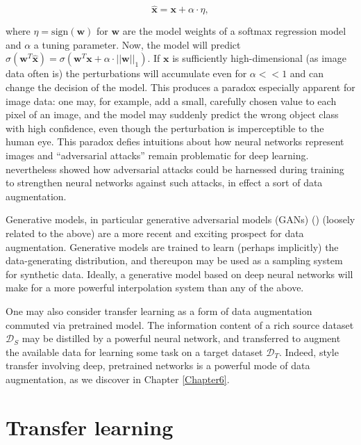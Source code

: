 \begin{equation}
\hat{\mathbf{x}} = \mathbf{x} + \alpha\cdot\eta,
\end{equation}

where $\eta = \text{sign}(\mathbf{w})$ for $\mathbf{w}$ are the model weights of a softmax regression model and $\alpha$ a tuning parameter. Now, the model will predict $\sigma(\mathbf{w}^T\hat{\mathbf{x}}) = \sigma(\mathbf{w}^T\mathbf{x} + \alpha\cdot||\mathbf{w}||_1)$. If $\mathbf{x}$ is sufficiently high-dimensional (as image data often is) the perturbations will accumulate even for $\alpha << 1$ and can change the decision of the model. This produces a paradox especially apparent for image data: one may, for example, add a small, carefully chosen value to each pixel of an image, and the model may suddenly predict the wrong object class with high confidence, even though the perturbation is imperceptible to the human eye. This paradox defies intuitions about how neural networks represent images and ``adversarial attacks'' remain problematic for deep learning. \cite{goodfellow2014explaining} nevertheless showed how adversarial attacks could be harnessed during training to strengthen neural networks against such attacks, in effect a sort of data augmentation.

Generative models, in particular generative adversarial models (GANs) (\cite{goodfellow2014generative}) (loosely related to the above) are a more recent and exciting prospect for data augmentation. Generative models are trained to learn (perhaps implicitly) the data-generating distribution, and thereupon may be used as a sampling system for synthetic data. Ideally, a generative model based on deep neural networks will make for a more powerful interpolation system than any of the above.

One may also consider transfer learning as a form of data augmentation commuted via pretrained model. The information content of a rich source dataset $\mathcal{D}_S$ may be distilled by a powerful neural network, and transferred to augment the available data for learning some task on a target dataset $\mathcal{D}_T$. Indeed, style transfer involving deep, pretrained networks \cite{gatys2016image} is a powerful mode of data augmentation, as we discover in Chapter \ref{Chapter6}.

\section{Transfer learning}

